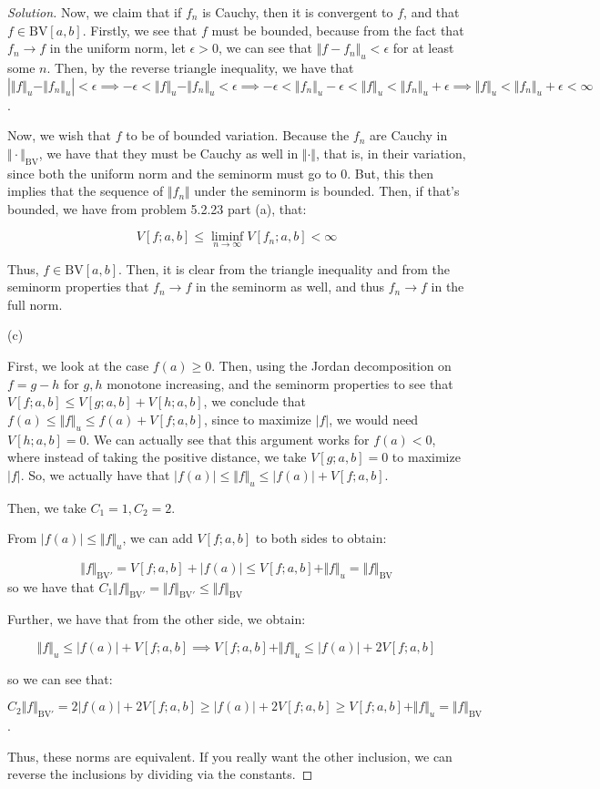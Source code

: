 \documentclass[10pt]{article}
\newcommand{\bv}{{\text{BV}}}
\begin{document}
\begin{proof}[Solution]
Now, we claim that if $f_n$ is Cauchy, then it is convergent to $f$, and that $f \in \bv[a,b]$. Firstly, we see that $f$ must be bounded, because from the fact that $f_n \to f$ in the uniform norm, let $\epsilon > 0$, we can see that $\Vert f - f_n \Vert_u < \epsilon $ for at least some $n$. Then,  by the reverse triangle inequality, we have that $|\Vert f \Vert_u  - \Vert f_n \Vert_u|< \epsilon  \implies   -\epsilon < \Vert f \Vert_u  - \Vert f_n \Vert_u < \epsilon  \implies  -\epsilon < \Vert f_n \Vert_u - \epsilon < \Vert f \Vert_u < \Vert f_n \Vert_u + \epsilon \implies \Vert f \Vert_u < \Vert f_n \Vert_u + \epsilon < \infty$.

Now, we wish that $f$ to be of bounded variation. Because the $f_n$ are Cauchy in $\Vert \cdot \Vert_{\bv}$, we have that they must be Cauchy as well in $\Vert \cdot \Vert$, that is, in their variation, since both the uniform norm and the seminorm must go to 0. But, this then implies that the sequence of $\Vert f_n \Vert$ under the seminorm is bounded. Then, if that's bounded, we have from problem 5.2.23 part (a), that:

$$ V[f;a,b] \leq \liminf_{n \to \infty} V[f_n; a,b] < \infty$$

Thus, $f  \in \bv[a,b]$. Then, it is clear from the triangle inequality and from the seminorm properties that $f_n \to f$ in the seminorm as well, and thus $f_n \to f$ in the full norm.

(c)

First, we look at the case $f(a) \geq 0$. Then, using the Jordan decomposition on $f = g - h$ for $g,h$ monotone increasing, and the seminorm properties to see that $V[f;a,b] \leq V[g;a,b] + V[h;a,b]$, we conclude that $f(a) \leq \Vert f \Vert_u \leq f(a) + V[f;a,b]$, since to maximize $|f|$, we would need $V[h;a,b] = 0$. We can actually see that this argument works for $f(a) < 0$, where instead of taking the positive distance, we take $V[g;a,b] = 0$ to maximize $|f|$. So, we actually have that $|f(a)| \leq \Vert f \Vert_u \leq |f(a)| + V[f;a,b]$.

Then, we take $C_1 = 1, C_2 = 2$. 

From $|f(a)| \leq \Vert f \Vert_u$, we can add $V[f;a,b]$ to both sides to obtain:

$$ \Vert f \Vert_{\bv'} =  V[f;a,b] + |f(a)| \leq V[f;a,b] +   \Vert f \Vert_u  =  \Vert f \Vert_{\bv}$$ so we have that $C_1 \Vert f \Vert_{\bv'} = \Vert f \Vert_{\bv'} \leq \Vert f \Vert_{\bv}$

Further, we have that from the other side, we obtain:

$$ \Vert f \Vert_u \leq |f(a)| + V[f;a,b] \implies  V[f;a,b] + \Vert f \Vert_u \leq |f(a)| + 2V[f;a,b] $$

so we can see that:

$$C_2 \Vert f \Vert_{\bv'} =  2|f(a)| + 2V[f;a,b] \geq  |f(a)| + 2V[f;a,b] \geq  V[f;a,b] + \Vert f \Vert_u = \Vert f \Vert_{\bv} $$.

Thus, these norms are equivalent. If you really want the other inclusion, we can reverse the inclusions by dividing via the constants.
\end{proof}
\end{document}
